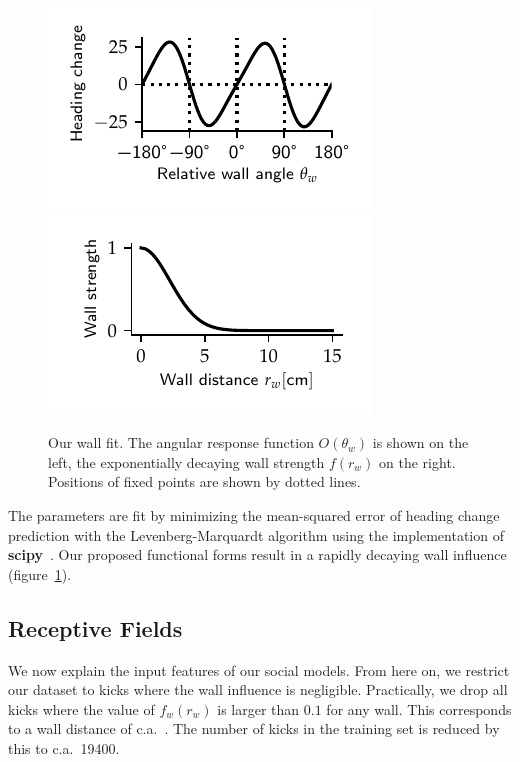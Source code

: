 \documentclass[nobib, a4paper]{tufte-handout}
\begin{document}
\begin{figure}[htb]
 \centering
 \includegraphics{wall_odd}~%
 \includegraphics{wall_force} 
 \caption{Our wall fit.
   The angular response function $O(\theta_w)$ is shown on the left, the exponentially decaying wall strength $f(r_w)$ on the right.
 Positions of fixed points are shown by dotted lines.}
\label{fig:wall-fit}
\end{figure}

The parameters are fit by minimizing the mean-squared error of heading change prediction with the Levenberg-Marquardt algorithm using the implementation of \textbf{scipy}~\autocite{scipy}.
Our proposed functional forms result in a rapidly decaying wall influence (figure~\ref{fig:wall-fit}).


\subsection{Receptive Fields}
We now explain the input features of our social models.
From here on, we restrict our dataset to kicks where the wall influence is negligible.
Practically, we drop all kicks where the value of \(f_w(r_w)\) is larger than $0.1$ for any wall.
This corresponds to a wall distance of c.a.\ .
The number of kicks in the training set is reduced by this to c.a.\ 19400.

\end{document}

